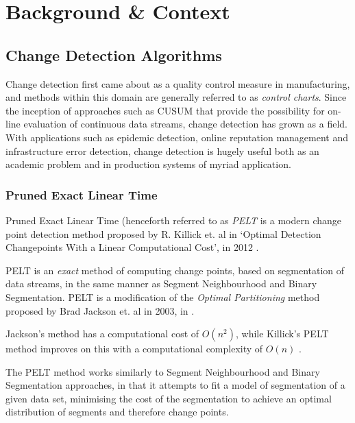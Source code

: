 \documentclass{uvamscse}	%
\begin{document}

\chapter{Background \& Context}

\section{Change Detection Algorithms}

Change detection first came about as a quality control measure in manufacturing, and methods within this domain are generally referred to as \emph{control charts}. Since the inception of approaches such as CUSUM that provide the possibility for on-line evaluation of continuous data streams, change detection has grown as a field. With applications such as epidemic detection, online reputation management and infrastructure error detection, change detection is hugely useful both as an academic problem and in production systems of myriad application.

\subsection{Pruned Exact Linear Time}

Pruned Exact Linear Time (henceforth referred to as \emph{PELT} is a modern change point detection method proposed by R. Killick et. al in `Optimal Detection Changepoints With a Linear Computational Cost', in 2012 \cite{Killick2011a}.

PELT is an \emph{exact} method of computing change points, based on segmentation of data streams, in the same manner as Segment Neighbourhood and Binary Segmentation. PELT is a modification of the \emph{Optimal Partitioning} method proposed by Brad Jackson et. al in 2003, in \cite{Jackson2003}.

Jackson's method has a computational cost of $O(n^2)$, while Killick's PELT method improves on this with a computational complexity of $O(n)$ \cite{Killick2011a}.

The PELT method works similarly to Segment Neighbourhood \cite{Auger1989} and Binary Segmentation \cite{Jackson2003} \cite{Yao1984} approaches, in that it attempts to fit a model of segmentation of a given data set, minimising the cost of the segmentation to achieve an optimal distribution of segments and therefore change points.
\end{document}
